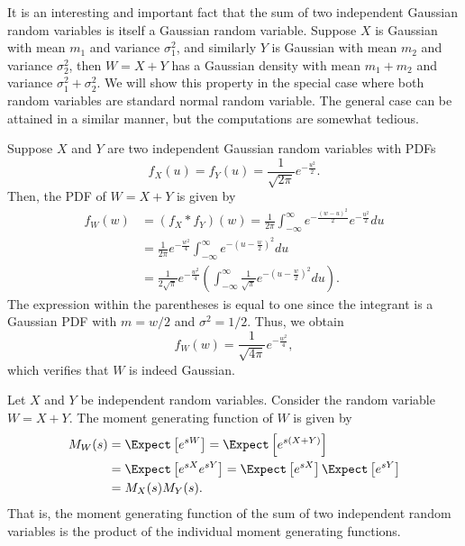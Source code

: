 \begin{example}
It is an interesting and important fact that the sum of two independent Gaussian random variables is itself a Gaussian random variable.
Suppose $X$ is Gaussian with mean $m_1$ and variance $\sigma_1^2$, and similarly $Y$ is Gaussian with mean $m_2$ and variance $\sigma_2^2$, then $W = X + Y$ has a Gaussian density with mean $m_1 + m_2$ and variance $\sigma_1^2 + \sigma_2^2$.
We will show this property in the special case where both random variables are standard normal random variable.
The general case can be attained in a similar manner, but the computations are somewhat tedious.

Suppose $X$ and $Y$ are two independent Gaussian random variables with PDFs
\begin{equation*}
f_X(u) = f_Y(u) = \frac 1{\sqrt{2\pi}} e^{-\frac{u^2}{2}} .
\end{equation*}
Then, the PDF of $W = X + Y$ is given by
\begin{equation*}
\begin{split}
f_W (w) &= (f_X \ast f_Y) (w)
= \frac{1}{2\pi}
\int_{-\infty}^{\infty} e^{-\frac{(w - u)^2}{2}} e^{-\frac{u^2}{2}} du \\
&= \frac{1}{2\pi} e^{- \frac{w^2}{4}}
\int_{-\infty}^{\infty} e^{- \left( u - \frac{w}{2} \right)^2} du \\
&= \frac{1}{2 \sqrt{\pi}} e^{- \frac{w^2}{4}}
\left( \int_{-\infty}^{\infty} \frac{1}{\sqrt{\pi}}
e^{-\left( u - \frac{w}{2} \right)^2} du \right) .
\end{split}
\end{equation*}
The expression within the parentheses is equal to one since the integrant is a Gaussian PDF with $m = w/2$ and $\sigma^2 = 1/2$.
Thus, we obtain
\begin{equation*}
f_W(w) = \frac{1}{\sqrt{4\pi}} e^{-\frac{w^2}{4}} ,
\end{equation*}
which verifies that $W$ is indeed Gaussian.
\end{example}

Let $X$ and $Y$ be independent random variables.
Consider the random variable $W = X + Y$.
The moment generating function of $W$ is given by
\begin{equation*}
\begin{split}
M_W (s) &= \Expect \left[ e^{sW} \right]
= \Expect \left[ e^{s(X + Y)} \right] \\
&= \Expect \left[ e^{sX} e^{sY} \right]
= \Expect \left[ e^{sX} \right] \Expect \left[ e^{sY} \right] \\
&= M_X(s) M_Y(s) .
\end{split}
\end{equation*}
That is, the moment generating function of the sum of two independent random variables is the product of the individual moment generating functions.

